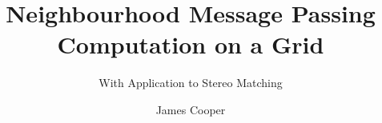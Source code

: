 \documentclass[11pt,partial,draft,doublespace]{aucklandthesis}
\begin{document}
\newcommand{\fsharp}{F\nolinebreak\hspace{-.05em}\raisebox{.3ex}{\tiny{\textbf{\#}}}}
\newcommand{\cps}{cP~systems}

%
%
%

\title{Neighbourhood Message Passing Computation on a Grid}
\subtitle{With Application to Stereo Matching}
\author{James Cooper}

\maketitle




\cleardoublepage\tableofcontents
\cleardoublepage\listoffixmes

% 

%
%
%
%

% 

% 
% 
% 
% 
% 
% 
% 
\end{document}
